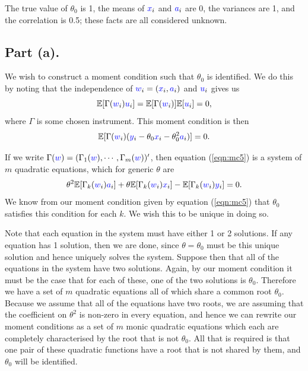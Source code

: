 \documentclass{article}
\renewcommand{\r}[1]{\textcolor{blue}{#1}}
\newcommand{\E}{\mathbb{E}}
\begin{document}
The true value of $\theta_{0}$ is 1, the means of $\r{x}_{i}$ and $\r{a}_{i}$ are 0, the variances are 1, and the correlation is 0.5; these facts are all considered unknown.

\subsection{Part (a).}
We wish to construct a moment condition such that $\theta_{0}$ is identified. We do this by noting that the independence of $\r{w}_{i}=(\r{x}_{i},\r{a}_{i})$ and $\r{u}_{i}$ gives us
\begin{equation} \E[\Gamma(\r{w}_{i})\r{u}_{i}]=\E[\Gamma(\r{w}_{i})]\E[\r{u}_{i}]=0,\end{equation}
where $\Gamma$ is some chosen instrument. This moment condition is then
\begin{equation}\label{eqn:mc5} \E[\Gamma(\r{w}_{i})(\r{y}_{i}-\theta_{0}\r{x}_{i}-\theta_{0}^{2}\r{a}_{i})]=0.\end{equation}

If we write $\Gamma(\r{w})=(\Gamma_{1}(\r{w}), \cdots, \Gamma_{m}(\r{w}))'$, then equation (\ref{eqn:mc5}) is a system of $m$ quadratic equations, which for generic $\theta$ are
\begin{equation} \theta^{2}\E[\Gamma_{k}(\r{w}_{i})\r{a}_{i}]+\theta\E[\Gamma_{k}(\r{w}_{i})\r{x}_{i}]-\E[\Gamma_{k}(\r{w}_{i})\r{y}_{i}]=0.\end{equation}
We know from our moment condition given by equation (\ref{eqn:mc5}) that $\theta_{0}$ satisfies this condition for each $k$. We wish this to be unique in doing so. 

Note that each equation in the system must have either 1 or 2 solutions. If any equation has 1 solution, then we are done, since $\theta=\theta_{0}$ must be this unique solution and hence uniquely solves the system. Suppose then that all of the equations in the system have two solutions. Again, by our moment condition it must be the case that for each of these, one of the two solutions is $\theta_{0}$. Therefore we have a set of $m$ quadratic equations all of which share a common root $\theta_{0}$. Because we assume that all of the equations have two roots, we are assuming that the coefficient on $\theta^{2}$ is non-zero in every equation, and hence we can rewrite our moment conditions as a set of $m$ monic quadratic equations which each are completely characterised by the root that is not $\theta_{0}$. All that is required is that one pair of these quadratic functions have a root that is not shared by them, and $\theta_{0}$ will be identified. 
\end{document}
